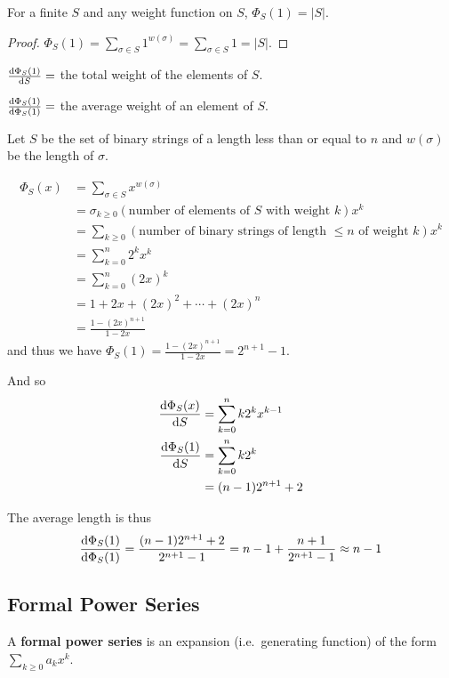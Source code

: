 \documentclass[12pt]{article}
\begin{document}
\begin{theorem}
For a finite $S$ and any weight function on $S$, $\Phi_S(1) = |S|$.
\end{theorem}

\begin{proof}
$\Phi_S(1) = \displaystyle\sum_{\sigma \in S} 1^{w(\sigma)} = \sum_{\sigma \in S} 1 = |S|$.
\end{proof}

\begin{theorem}
$\frac{{\rm d} \Phi_S(1)}{{\rm d} S} =$ the total weight of the elements of $S$.
\end{theorem}

\begin{theorem}
$\frac{{\rm d} \Phi_S(1)}{{\rm d} \Phi_S(1)} =$ the average weight of an element of $S$.
\end{theorem}

\begin{example}
Let $S$ be the set of binary strings of a length less than or equal to $n$ and $w(\sigma)$ be the length of $\sigma$.

\begin{align*}
\Phi_S(x) &= \sum_{\sigma \in S} x^{w(\sigma)}\\
&= \sigma_{k \geq 0} (\text{number of elements of }S\text{ with weight }k) x^k\\
&= \sum_{k \geq 0} (\text{number of binary strings of length }\leq n\text{ of weight }k) x^k\\
&= \sum_{k=0}^n 2^k x^k\\
&= \sum_{k=0}^n {(2x)}^k\\
&= 1 + 2x + {(2x)}^2 + \cdots + {(2x)}^n\\
&= \frac{1 - {(2x)}^{n+1}}{1 - 2x}
\end{align*}
and thus we have $\Phi_S(1) = \frac{1 - {(2x)}^{n+1}}{1 - 2x} = 2^{n+1} - 1$.

And so
\begin{align*}
\frac{{\rm d} \Phi_S(x)}{{\rm d} S} &= \sum_{k=0}^n k 2^k x^{k-1}\\
\frac{{\rm d} \Phi_S(1)}{{\rm d} S} &= \sum_{k=0}^n k 2^k\\
&= (n-1)2^{n+1} + 2
\end{align*}

The average length is thus \[ \frac{{\rm d} \Phi_S(1)}{{\rm d} \Phi_S(1)} = \frac{(n-1)2^{n+1} + 2}{2^{n+1} - 1} = n - 1 + \frac{n+1}{2^{n+1} - 1} \approx n - 1 \]
\end{example}

\subsection{Formal Power Series}
A {\bf formal power series} is an expansion (i.e.\ generating function) of the form $\displaystyle\sum_{k \geq 0} a_k x^k$.
\end{document}
